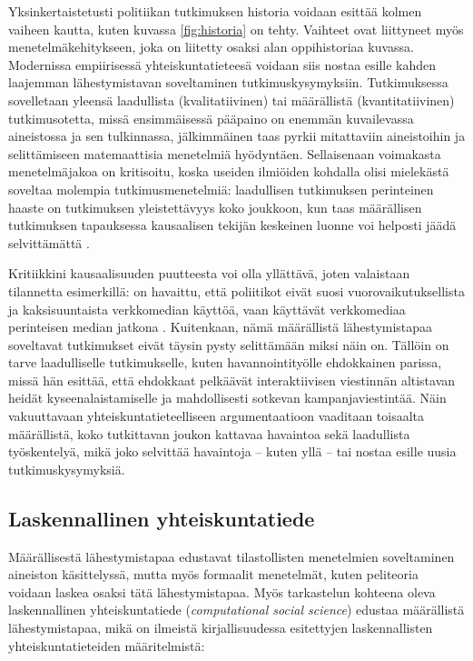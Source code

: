 \documentclass[finnish,gradu,twoside,12pt]{tktltiki}
\begin{document}
Yksinkertaistetusti politiikan tutkimuksen historia voidaan esittää kolmen vaiheen kautta, kuten kuvassa \ref{fig:historia} on tehty. Vaihteet ovat liittyneet myös menetelmäkehitykseen, joka on liitetty osaksi alan oppihistoriaa kuvassa. Modernissa empiirisessä yhteiskuntatieteesä voidaan siis nostaa esille kahden laajemman lähestymistavan soveltaminen tutkimuskysymyksiin. Tutkimuksessa sovelletaan yleensä laadullista (kvalitatiivinen) tai määrällistä (kvantitatiivinen) tutkimusotetta, missä ensimmäisessä pääpaino on enemmän kuvailevassa aineistossa ja sen tulkinnassa, jälkimmäinen taas pyrkii mitattaviin aineistoihin ja selittämiseen matemaattisia menetelmiä hyödyntäen. Sellaisenaan voimakasta menetelmäjakoa on kritisoitu, koska useiden ilmiöiden kohdalla olisi mielekästä soveltaa molempia tutkimusmenetelmiä: laadullisen tutkimuksen perinteinen haaste on tutkimuksen yleistettävyys koko joukkoon, kun taas määrällisen tutkimuksen tapauksessa kausaalisen tekijän keskeinen luonne voi helposti jäädä selvittämättä \citep{ragin96,mcgraw96,silverman00}.

Kritiikkini kausaalisuuden puutteesta voi olla yllättävä, joten valaistaan tilannetta esimerkillä: on havaittu, että poliitikot eivät suosi vuorovaikutuksellista ja kaksisuuntaista verkkomedian käyttöä, vaan käyttävät verkkomediaa perinteisen median jatkona \citep{Golbeck2010}. Kuitenkaan, nämä määrällistä lähestymistapaa soveltavat tutkimukset eivät täysin pysty selittämään miksi näin on. Tällöin on tarve laadulliselle tutkimukselle, kuten \citet{Stromer-Galley2000} havannointityölle ehdokkainen parissa, missä hän esittää, että ehdokkaat pelkäävät interaktiivisen viestinnän altistavan heidät kyseenalaistamiselle ja mahdollisesti sotkevan kampanjaviestintää. Näin vakuuttavaan yhteiskuntatieteelliseen argumentaatioon vaaditaan toisaalta määrällistä, koko tutkittavan joukon kattavaa havaintoa sekä laadullista työskentelyä, mikä joko selvittää havaintoja -- kuten yllä -- tai nostaa esille uusia tutkimuskysymyksiä.

\subsection{Laskennallinen yhteiskuntatiede}

Määrällisestä lähestymistapaa edustavat tilastollisten menetelmien soveltaminen aineiston käsittelyssä, mutta myös formaalit menetelmät, kuten peliteoria voidaan laskea osaksi tätä lähestymistapaa. Myös tarkastelun kohteena oleva laskennallinen yhteiskuntatiede (\textit{computational social science}) edustaa määrällistä lähestymistapaa, mikä on ilmeistä kirjallisuudessa esitettyjen laskennallisten yhteiskuntatieteiden määritelmistä:
\end{document}
